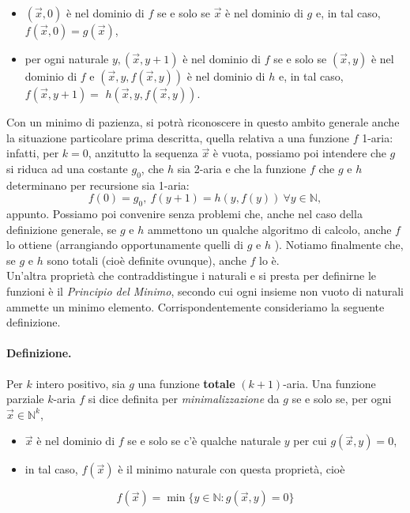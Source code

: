 \begin{itemize}
    \item $(\vec{x}, 0)$ è nel dominio di $f$ se e solo se $\vec{x}$ è nel
          dominio di $g$ e, in tal caso, $f(\vec{x}, 0)=g(\vec{x})$,
    \item per ogni naturale $y,(\vec{x}, y+1)$ è nel dominio di $f$ se e solo se
          $(\vec{x}, y)$ è nel dominio di $f$ e $(\vec{x}, y, f(\vec{x}, y))$ è nel
          dominio di $h$ e, in tal caso, $f(\vec{x}, y+1)=$ $h(\vec{x}, y, f(\vec{x},
              y))$.

\end{itemize}

Con un minimo di pazienza, si potrà riconoscere in questo ambito generale anche
la situazione particolare prima descritta, quella relativa a una funzione $f$
1-aria: infatti, per $k=0$, anzitutto la sequenza $\vec{x}$ è vuota, possiamo
poi intendere che $g$ si riduca ad una costante $g_0$, che $h$ sia 2-aria e che
la funzione $f$ che $g$ e $h$ determinano per recursione sia 1-aria:
$$
    f(0)=g_0, \  f(y+1)=h(y, f(y)) \ \forall y \in \mathbb{N},
$$
appunto. Possiamo poi convenire senza problemi che, anche nel caso della
definizione generale, se $g$ e $h$ ammettono un qualche algoritmo di calcolo,
anche $f$ lo ottiene (arrangiando opportunamente quelli di $g$ e $h$ ). Notiamo
finalmente che, se $g$ e $h$ sono totali (cioè definite ovunque), anche $f$ lo
è.\\

Un'altra proprietà che contraddistingue i naturali e si presta per definirne le
funzioni è il \textit{Principio del Minimo}, secondo cui ogni insieme non vuoto di
naturali ammette un minimo elemento. Corrispondentemente consideriamo la
seguente definizione.

\paragraph{Definizione.} Per $k$ intero positivo, sia $g$ una funzione \textbf{totale} $(k+1)$-aria.
Una funzione parziale $k$-aria $f$ si dice definita per \textit{minimalizzazione} da $g$
se e solo se, per ogni $\vec{x} \in \mathbb{N}^k$,

\begin{itemize}
    \item $\vec{x}$ è nel dominio di
          $f$ se e solo se c'è qualche naturale $y$ per cui $g(\vec{x}, y)=0$,
    \item in tal
          caso, $f(\vec{x})$ è il minimo naturale con questa proprietà, cioè
\end{itemize}
\[
    f(\vec{x})=\min \{y \in \mathbb{N}: g(\vec{x}, y)=0\}
\]


